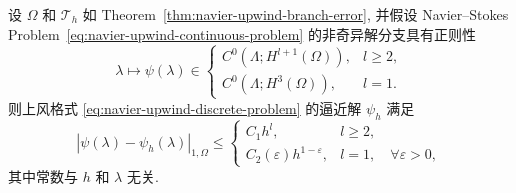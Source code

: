 \setcounter{statement}{1}
\begin{Theorem}\label{thm:navier-upwind-stream-h1-error}
设 $\Omega$ 和 $\mathcal T_h$ 如 Theorem~\ref{thm:navier-upwind-branch-error},
并假设 Navier--Stokes Problem~\eqref{eq:navier-upwind-continuous-problem}
的非奇异解分支具有正则性
\[
\lambda\mapsto\psi(\lambda)\in
\begin{cases}
C^0(\Lambda;H^{l+1}(\Omega)),&l\geq2,\\
C^0(\Lambda;H^3(\Omega)),&l=1.
\end{cases}
\]
则上风格式 \eqref{eq:navier-upwind-discrete-problem} 的逼近解 $\psi_h$ 满足
\begin{equation}\label{eq:navier-upwind-stream-h1-optimal}
|\psi(\lambda)-\psi_h(\lambda)|_{1,\Omega}
\leq
\begin{cases}
C_1h^l,&l\geq2,\\
C_2(\varepsilon)h^{1-\varepsilon},&l=1,\quad\forall\varepsilon>0,
\end{cases}
\end{equation}
其中常数与 $h$ 和 $\lambda$ 无关.
\end{Theorem}
